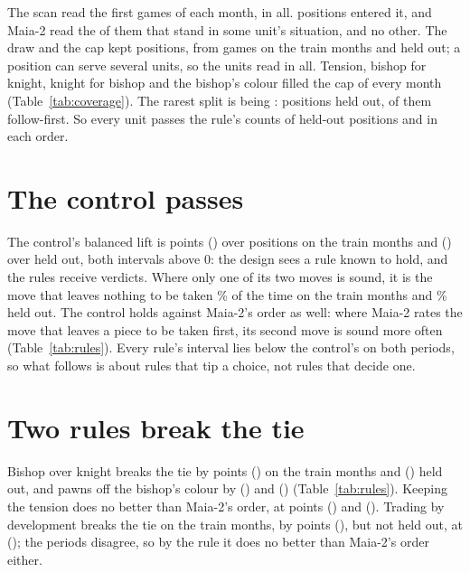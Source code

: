 \documentclass[11pt]{article}
\begin{document}
The scan read the first \PerMonth{} games of each month, \Games{} in all. \Entering{} positions
entered it, and Maia-2 read the \InUnit{} of them that stand in some unit's situation, and no
other. The draw and the cap kept \Scored{} positions, from \GamesTrain{} games on the train months
and \GamesHeld{} held out; a position can serve several units, so the units read \UnitRows{} in
all. Tension, bishop for knight, knight for bishop and the bishop's colour filled the cap of
\Cap{} every month (Table~\ref{tab:coverage}). The rarest split is being \ThinName: \ThinHeld{}
positions held out, \ThinHeldFollow{} of them follow-first. So every unit passes the rule's counts
of \MinHeld{} held-out positions and \MinOrder{} in each order.

\CoverageTable

\section{The control passes}

The control's balanced lift is \ControlTrain{} points (\ControlTrainCi) over \ControlTrainN{}
positions on the train months and \ControlHeld{} (\ControlHeldCi) over \ControlHeldN{} held out,
both intervals above 0: the design sees a rule known to hold, and the rules receive verdicts. Where
only one of its two moves is sound, it is the move that leaves nothing to be taken
\ControlOneTrain\% of the time on the train months and \ControlOneHeld\% held out. The control
holds against Maia-2's order as well: where Maia-2 rates the move that leaves a piece to be taken
first, its second move is sound more often (Table~\ref{tab:rules}). Every rule's interval lies below
the control's on both periods, so what follows is about rules that tip a choice, not rules that
decide one.

\section{Two rules break the tie}

Bishop over knight breaks the tie by \BkTrain{} points (\BkTrainCi) on the train months and
\BkHeld{} (\BkHeldCi) held out, and pawns off the bishop's colour by \ColTrain{} (\ColTrainCi) and
\ColHeld{} (\ColHeldCi) (Table~\ref{tab:rules}). Keeping the tension does no better than Maia-2's
order, at \TenTrain{} points (\TenTrainCi) and \TenHeld{} (\TenHeldCi). Trading by development
breaks the tie on the train months, by \TrTrain{} points (\TrTrainCi), but not held out, at
\TrHeld{} (\TrHeldCi); the periods disagree, so by the rule it does no better than Maia-2's order
either.
\end{document}
